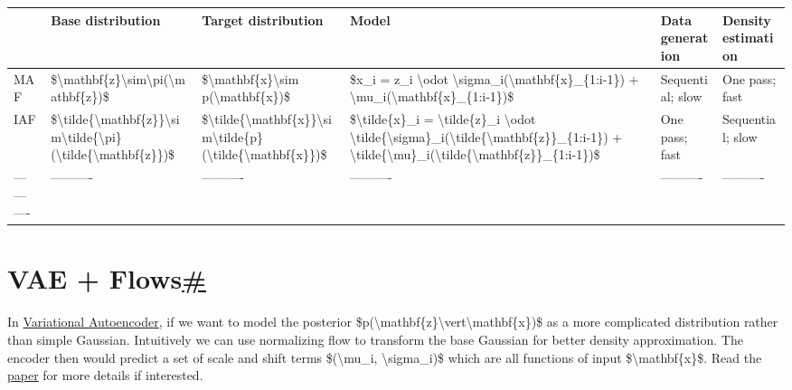 \begin{longtable}[]{@{}llllll@{}}
\toprule\noalign{}
& Base distribution & Target distribution & Model & Data generation & Density estimation \\
\midrule\noalign{}
\endhead
\bottomrule\noalign{}
\endlastfoot
MAF & \$\textbackslash mathbf\{z\}\textbackslash sim\textbackslash pi(\textbackslash mathbf\{z\})\$ & \$\textbackslash mathbf\{x\}\textbackslash sim p(\textbackslash mathbf\{x\})\$ & \$x\_i = z\_i \textbackslash odot \textbackslash sigma\_i(\textbackslash mathbf\{x\}\_\{1:i-1\}) + \textbackslash mu\_i(\textbackslash mathbf\{x\}\_\{1:i-1\})\$ & Sequential; slow & One pass; fast \\
IAF & \$\textbackslash tilde\{\textbackslash mathbf\{z\}\}\textbackslash sim\textbackslash tilde\{\textbackslash pi\}(\textbackslash tilde\{\textbackslash mathbf\{z\}\})\$ & \$\textbackslash tilde\{\textbackslash mathbf\{x\}\}\textbackslash sim\textbackslash tilde\{p\}(\textbackslash tilde\{\textbackslash mathbf\{x\}\})\$ & \$\textbackslash tilde\{x\}\_i = \textbackslash tilde\{z\}\_i \textbackslash odot \textbackslash tilde\{\textbackslash sigma\}\_i(\textbackslash tilde\{\textbackslash mathbf\{z\}\}\_\{1:i-1\}) + \textbackslash tilde\{\textbackslash mu\}\_i(\textbackslash tilde\{\textbackslash mathbf\{z\}\}\_\{1:i-1\})\$ & One pass; fast & Sequential; slow \\
---------- & ---------- & ---------- & ---------- & ---------- & ---------- \\
\end{longtable}

\section{\texorpdfstring{VAE + Flows\hyperref[vae--flows]{\#}}{VAE + Flows\#}}\label{vae--flows}

In \href{https://lilianweng.github.io/posts/2018-08-12-vae/\#vae-variational-autoencoder}{Variational Autoencoder}, if we want to model the posterior \$p(\textbackslash mathbf\{z\}\textbackslash vert\textbackslash mathbf\{x\})\$ as a more complicated distribution rather than simple Gaussian. Intuitively we can use normalizing flow to transform the base Gaussian for better density approximation. The encoder then would predict a set of scale and shift terms \$(\textbackslash mu\_i, \textbackslash sigma\_i)\$ which are all functions of input \$\textbackslash mathbf\{x\}\$. Read the \href{https://arxiv.org/abs/1809.05861}{paper} for more details if interested.

